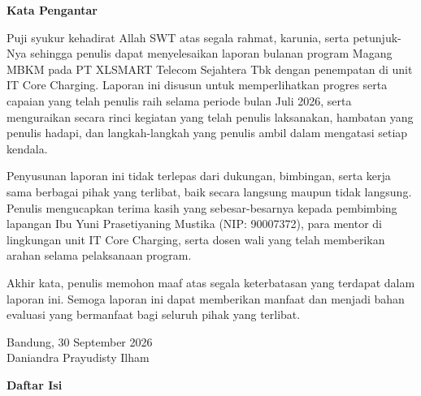 \documentclass[12pt,a4paper]{article}
\begin{document}
\clearpage
\setcounter{page}{3}

\begin{center}
    {\bfseries\large Kata Pengantar\par}
\end{center}
\vspace{0.6cm}

Puji syukur kehadirat Allah SWT atas segala rahmat, karunia, serta petunjuk-Nya sehingga penulis dapat menyelesaikan laporan bulanan program Magang MBKM pada PT XLSMART Telecom Sejahtera Tbk dengan penempatan di unit IT Core Charging. Laporan ini disusun untuk memperlihatkan progres serta capaian yang telah penulis raih selama periode bulan Juli 2026, serta menguraikan secara rinci kegiatan yang telah penulis laksanakan, hambatan yang penulis hadapi, dan langkah-langkah yang penulis ambil dalam mengatasi setiap kendala.

Penyusunan laporan ini tidak terlepas dari dukungan, bimbingan, serta kerja sama berbagai pihak yang terlibat, baik secara langsung maupun tidak langsung. Penulis mengucapkan terima kasih yang sebesar-besarnya kepada pembimbing lapangan Ibu Yuni Prasetiyaning Mustika (NIP: 90007372), para mentor di lingkungan unit IT Core Charging, serta dosen wali yang telah memberikan arahan selama pelaksanaan program. 

Akhir kata, penulis memohon maaf atas segala keterbatasan yang terdapat dalam laporan ini. Semoga laporan ini dapat memberikan manfaat dan menjadi bahan evaluasi yang bermanfaat bagi seluruh pihak yang terlibat.

\vspace{1.2cm}
\noindent
\begin{flushright}
    Bandung, 30 September 2026\\[2.0cm]
    Daniandra Prayudisty Ilham
\end{flushright}

\clearpage
\setcounter{page}{4}

\begin{center}
    {\bfseries\large Daftar Isi\par}
\end{center}
\vspace{0.6cm}
\end{document}
